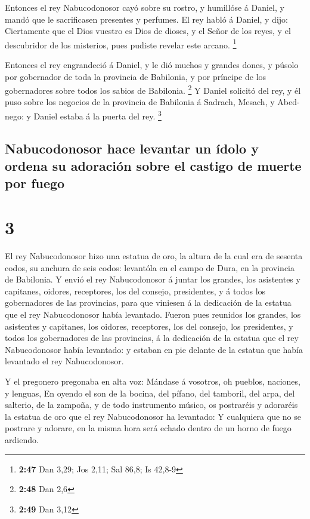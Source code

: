  Entonces el rey Nabucodonosor cayó sobre su rostro, y
humillóse á Daniel, y mandó que le sacrificasen presentes y perfumes.
 El rey habló á Daniel, y dijo: Ciertamente que el Dios
vuestro es Dios de dioses, y el Señor de los reyes, y el descubridor de
los misterios, pues pudiste revelar este arcano. \footnote{\textbf{2:47}
  Dan 3,29; Jos 2,11; Sal 86,8; Is 42,8-9}

 Entonces el rey engrandeció á Daniel, y le dió muchos y
grandes dones, y púsolo por gobernador de toda la provincia de
Babilonia, y por príncipe de los gobernadores sobre todos los sabios de
Babilonia. \footnote{\textbf{2:48} Dan 2,6}  Y Daniel
solicitó del rey, y él puso sobre los negocios de la provincia de
Babilonia á Sadrach, Mesach, y Abed-nego: y Daniel estaba á la puerta
del rey. \footnote{\textbf{2:49} Dan 3,12}

\hypertarget{nabucodonosor-hace-levantar-un-uxeddolo-y-ordena-su-adoraciuxf3n-sobre-el-castigo-de-muerte-por-fuego}{%
\subsection{Nabucodonosor hace levantar un ídolo y ordena su adoración
sobre el castigo de muerte por
fuego}\label{nabucodonosor-hace-levantar-un-uxeddolo-y-ordena-su-adoraciuxf3n-sobre-el-castigo-de-muerte-por-fuego}}

\hypertarget{section-2}{%
\section{3}\label{section-2}}

 El rey Nabucodonosor hizo una estatua de oro, la altura
de la cual era de sesenta codos, su anchura de seis codos: levantóla en
el campo de Dura, en la provincia de Babilonia.  Y envió
el rey Nabucodonosor á juntar los grandes, los asistentes y capitanes,
oidores, receptores, los del consejo, presidentes, y á todos los
gobernadores de las provincias, para que viniesen á la dedicación de la
estatua que el rey Nabucodonosor había levantado.  Fueron
pues reunidos los grandes, los asistentes y capitanes, los oidores,
receptores, los del consejo, los presidentes, y todos los gobernadores
de las provincias, á la dedicación de la estatua que el rey
Nabucodonosor había levantado: y estaban en pie delante de la estatua
que había levantado el rey Nabucodonosor.

 Y el pregonero pregonaba en alta voz: Mándase á vosotros,
oh pueblos, naciones, y lenguas,  En oyendo el son de la
bocina, del pífano, del tamboril, del arpa, del salterio, de la zampoña,
y de todo instrumento músico, os postraréis y adoraréis la estatua de
oro que el rey Nabucodonosor ha levantado:  Y cualquiera
que no se postrare y adorare, en la misma hora será echado dentro de un
horno de fuego ardiendo.

